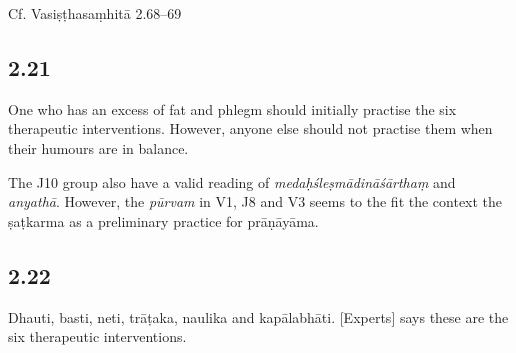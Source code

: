 \begin{ekdosis}
\begin{testimonia}[hp02_020]
Cf. Vasiṣṭhasaṃhitā 2.68--69

\begin{versinnote}
\end{versinnote}
\end{testimonia}

\begin{philcomm}[hp02_020]

\end{philcomm}

\subsection*{2.21}
\begin{translation}[hp02_021]
One who has an excess of fat and phlegm should initially practise the six therapeutic interventions. However, anyone else should not practise them when their humours are in balance.
\end{translation}

\begin{sources}[hp02_021]
\end{sources}

\begin{testimonia}[hp02_021]

\end{testimonia}

\begin{philcomm}[hp02_021]
The J10 group also have a valid reading of \emph{medaḥśleṣmādināśārthaṃ} and \emph{anyathā}. However, the \emph{pūrvam} in V1, J8 and V3 seems to the fit the context the ṣaṭkarma as a preliminary practice for prāṇāyāma.
\end{philcomm}

\subsection*{2.22}
\begin{translation}[hp02_022]
Dhauti, basti, neti, trāṭaka, naulika and kapālabhāti. [Experts] says these are the six therapeutic interventions.
\end{translation}


\end{ekdosis}
